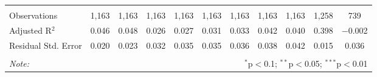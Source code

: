 \begin{table}[!htbp]
\begin{adjustbox}{width=1.35\textwidth}
\begin{tabular}{@{\extracolsep{5pt}}lcccccccccc}
\hline \\[-1.8ex] 
Observations & 1,163 & 1,163 & 1,163 & 1,163 & 1,163 & 1,163 & 1,163 & 1,163 & 1,258 & 739 \\ 
Adjusted R$^{2}$ & 0.046 & 0.048 & 0.026 & 0.027 & 0.031 & 0.033 & 0.042 & 0.040 & 0.398 & $-$0.002 \\ 
Residual Std. Error & 0.020 & 0.023 & 0.032 & 0.035 & 0.035 & 0.036 & 0.038 & 0.042 & 0.015 & 0.036 \\ 
\hline 
\hline \\[-1.8ex] 
\textit{Note:}  & \multicolumn{10}{r}{$^{*}$p$<$0.1; $^{**}$p$<$0.05; $^{***}$p$<$0.01} \\ 
\end{tabular} 
\end{adjustbox}
\end{table} 
